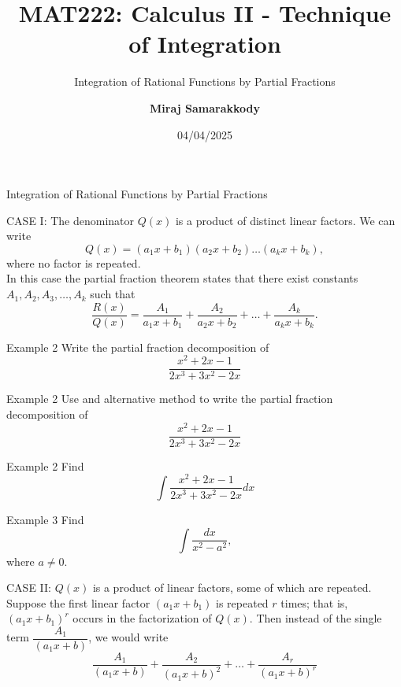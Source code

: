 \documentclass{beamer}
\title{MAT222: Calculus II - Technique of Integration}
\subtitle{Integration of Rational Functions by Partial Fractions}
\author{\textbf{Miraj Samarakkody}}
\institute{Tougaloo College}
\date{04/04/2025}
\begin{document}
\begin{frame}
    \titlepage
\end{frame}





\begin{frame}{}
\begin{center}
    \Huge{Integration of Rational Functions by Partial Fractions}
\end{center}
\end{frame}


\begin{frame}{CASE I: The denominator \(Q(x)\) is a product of distinct linear factors.}    
We can write \[Q(x)=(a_1 x+b_1)(a_2x+b_2)\dots (a_k x +b_k),\] where no factor is repeated. \\ \pause
\vspace{0.2in}
In this case the partial fraction theorem states that there exist constants \(A_1,A_2,A_3, \dots , A_k\) such that \[\dfrac{R(x)}{Q(x)}= \dfrac{A_1}{a_1x+b_1}+ \dfrac{A_2}{a_2x+b_2}+ \dots + \dfrac{A_k}{a_k x +b_k}.\]
\end{frame}

\begin{frame}{Example 2}
Write the partial fraction decomposition of \[\dfrac{x^2 +2x -1}{2x^3+3x^2-2x}\]
\end{frame}

\begin{frame}{Example 2}
    Use and alternative method to write the partial fraction decomposition of \[\dfrac{x^2 +2x -1}{2x^3+3x^2-2x}\]
    \end{frame}

\begin{frame}{Example 2}
Find \[\int \dfrac{x^2 +2x -1}{2x^3+3x^2-2x}dx\]
\end{frame}

\begin{frame}{Example 3}
Find \[\int \dfrac{dx}{x^2-a^2},\] where \(a \ne 0\).
\end{frame}

\begin{frame}{CASE II: \(Q(x)\) is a product of linear factors, some of which are repeated.}
Suppose the first linear factor \((a_1 x+b_1)\) is repeated \(r\) times; that is, \((a_1 x +b_1)^r\) occurs in the factorization of \(Q(x)\). Then instead of the single term \(\dfrac{A_1}{(a_1 x+b)}\), we would write 
\[\dfrac{A_1}{(a_1 x+b)}+\dfrac{A_2}{(a_1 x+b)^2}+\dots + \dfrac{A_r}{(a_1 x+b)^r}\]
\end{frame}
\end{document}
